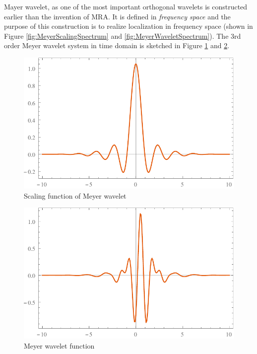 \documentclass{book}
\newcommand{\tmtextit}[1]{{\itshape{#1}}}
\begin{document}
Mayer wavelet, as one of the most important orthogonal wavelets is constructed
earlier than the invention of MRA. It is defined in \tmtextit{frequency space}
and the purpose of this construction is to realize localization in frequency
space (shown in Figure \ref{fig:MeyerScalingSpectrum} and
\ref{fig:MeyerWaveletSpectrum}). The 3rd order Meyer wavelet system in time
domain is sketched in Figure \ref{fig:MeyerPhi} and \ref{fig:MeyerPsi}.

\begin{figure}[h]
  \includegraphics{Figures/MeyerWavetletPhi.pdf}
  \caption{\label{fig:MeyerPhi}Scaling function of Meyer wavelet}
\end{figure}

\begin{figure}[h]
  \includegraphics{Figures/MeyerWavetletPsi.pdf}
  \caption{\label{fig:MeyerPsi}Meyer wavelet function}
\end{figure}

\
\end{document}
